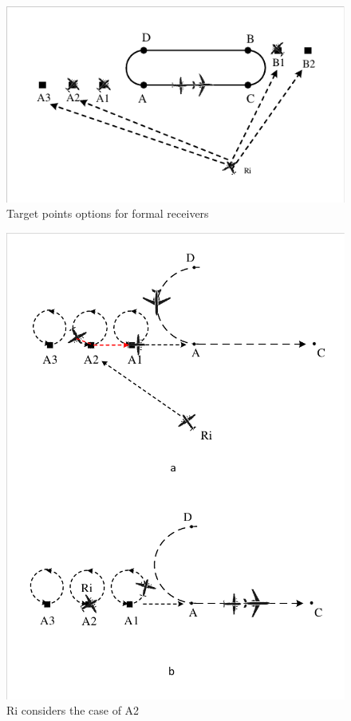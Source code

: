 \begin{figure}[htbp]
	\centerline{\includegraphics[width=.35\textwidth]{Figures/Figs_Ch15/fig4.pdf}}
	\caption{Target points options for formal receivers}
	\label{fig}
\end{figure}
\begin{figure}[htbp]
	\centerline{\includegraphics[width=.35\textwidth]{Figures/Figs_Ch15/fig5.pdf}}
	\caption{Ri considers the case of A2}
	\label{fig}
\end{figure}

